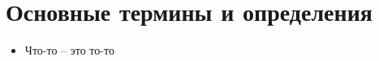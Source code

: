 \section{Основные термины и определения}

\begin{itemize}
    \item Что-то -- это то-то
\end{itemize}